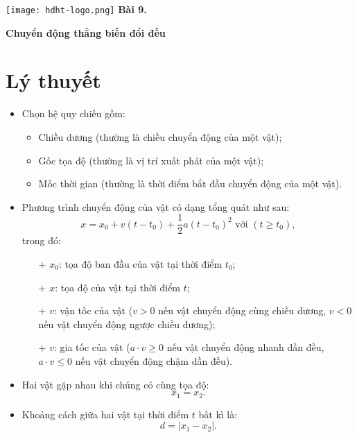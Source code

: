 \newcommand{\chapter}[2][]{
	\newcommand{\chapname}{#2}
	\begin{flushleft}
		\begin{minipage}[t]{\linewidth}
			\texttt{[image: hdht-logo.png]}
			\hspace{0pt}	
			\sffamily\bfseries\large Bài  9.
			\begin{flushleft}
				\huge\bfseries #1
			\end{flushleft}
		\end{minipage}
	\end{flushleft}
	\vspace{1cm}
	\normalfont\normalsize
}
\chapter[Chuyển động thẳng biến đổi đều]{Chuyển động thẳng biến đổi đều}
\section{Lý thuyết}

	\begin{itemize}
	\item Chọn hệ quy chiếu gồm:
	\begin{itemize}
		\item Chiều dương (thường là chiều chuyển động của một vật);
		\item Gốc tọa độ (thường là vị trí xuất phát của một vật);
		\item Mốc thời gian (thường là thời điểm bắt đầu chuyển động của một vật).
	\end{itemize}
	\item Phương trình chuyển động của vật có dạng tổng quát như sau:
	\begin{equation*}
		x=x_0+v(t-t_0)+\dfrac{1}{2}a(t-t_0)^2\textrm{ với }(t\geq t_0),
	\end{equation*}
	trong đó:
	\begin{itemize}
		\item[+] $x_0$: tọa độ ban đầu của vật tại thời điểm $t_0$;
		\item[+] $x$: tọa độ của vật tại thời điểm $t$;
		\item[+] $v$: vận tốc của vật ($v>0$ nếu vật chuyển động cùng chiều dương, $v<0$ nếu vật chuyển động ngược chiều dương);
		\item[+] $v$: gia tốc của vật ($a\cdot v\geq 0$ nếu vật chuyển động nhanh dần đều, $a\cdot v\leq 0$ nếu vật chuyển động chậm dần đều).
	\end{itemize}
	\item Hai vật gặp nhau khi chúng có cùng tọa độ:
	\begin{equation*}
		x_1=x_2.
	\end{equation*}
	\item Khoảng cách giữa hai vật tại thời điểm $t$ bất kì là:
	\begin{equation*}
		d=\left|x_1-x_2\right|.
	\end{equation*}
\end{itemize}	
